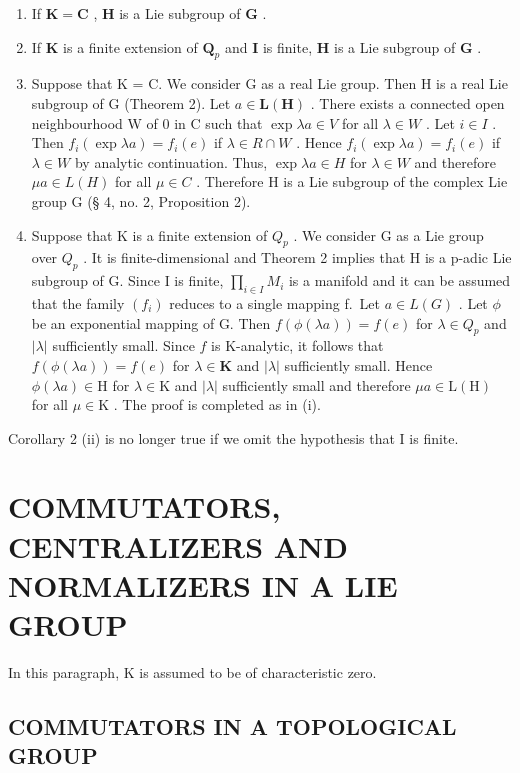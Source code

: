 \begin{enumerate}
\def\labelenumi{(\roman{enumi})}
\item
  If \(\mathbf{K} = \mathbf{C}\) , \(\mathbf{H}\) is a Lie subgroup of \(\mathbf{G}\) .
\item
  If \(\mathbf{K}\) is a finite extension of \(\mathbf{Q}_p\) and \(\mathbf{I}\) is finite, \(\mathbf{H}\) is a Lie subgroup of \(\mathbf{G}\) .
\item
  Suppose that K = C. We consider G as a real Lie group. Then H is a real Lie subgroup of G (Theorem 2). Let \(a \in \mathbf{L}(\mathbf{H})\) . There exists a connected open neighbourhood W of 0 in C such that \(\exp \lambda a \in V\) for all \(\lambda \in W\) . Let \(i \in I\) . Then \(f_i(\exp \lambda a) = f_i(e)\) if \(\lambda \in R \cap W\) . Hence \(f_i(\exp \lambda a) = f_i(e)\) if \(\lambda \in W\) by analytic continuation. Thus, \(\exp \lambda a \in H\) for \(\lambda \in W\) and therefore \(\mu a \in L(H)\) for all \(\mu \in C\) . Therefore H is a Lie subgroup of the complex Lie group G (§ 4, no. 2, Proposition 2).
\item
  Suppose that K is a finite extension of \(Q_{p}\) . We consider G as a Lie group over \(Q_{p}\) . It is finite-dimensional and Theorem 2 implies that H is a p-adic Lie subgroup of G. Since I is finite, \(\prod_{i\in I} M_{i}\) is a manifold and it can be assumed that the family \((f_{i})\) reduces to a single mapping f.~Let \(a \in L(G)\) . Let \(\phi\) be an exponential mapping of G. Then \(f(\phi(\lambda a)) = f(e)\) for \(\lambda \in Q_{p}\) and \(|\lambda|\) sufficiently small. Since \(f\) is K-analytic, it follows that \(f(\phi (\lambda a)) = f(e)\) for \(\lambda \in \mathbf{K}\) and \(|\lambda|\) sufficiently small. Hence \(\phi (\lambda a) \in \mathrm{H}\) for \(\lambda \in \mathrm{K}\) and \(|\lambda|\) sufficiently small and therefore \(\mu a \in \mathrm{L(H)}\) for all \(\mu \in \mathrm{K}\) . The proof is completed as in (i).
\end{enumerate}

Corollary 2 (ii) is no longer true if we omit the hypothesis that I is finite.

\section{COMMUTATORS, CENTRALIZERS AND NORMALIZERS IN A LIE GROUP}

In this paragraph, K is assumed to be of characteristic zero.

\subsection{COMMUTATORS IN A TOPOLOGICAL GROUP}

